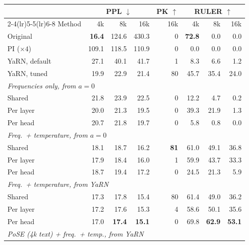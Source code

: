 
\begin{table}[t]
\centering
\footnotesize
\setlength{\tabcolsep}{2.4pt}
\begin{tabular}{@{}l rrr r rrr@{}}
\toprule
& \multicolumn{3}{c}{PPL $\downarrow$} & PK $\uparrow$ & \multicolumn{3}{c}{RULER $\uparrow$} \\
\cmidrule(lr){2-4}\cmidrule(lr){5-5}\cmidrule(lr){6-8}
Method & 4k & 8k & 16k & 16k & 4k & 8k & 16k \\
\midrule
Original     & \textbf{16.4} & 124.6 & 430.3 & 0 & \textbf{72.8} & 0.0 & 0.0 \\
PI ($\times 4$)   & 109.1 & 118.5 & 110.9 & 0 & 0.0 & 0.0 & 0.0 \\
YaRN, default     & 27.1 & 40.1 & 41.7 & 1 & 8.3 & 6.6 & 1.2 \\
YaRN, tuned       & 19.9 & 22.9 & 21.4 & 80 & 45.7 & 35.4 & 24.0 \\
\midrule
\multicolumn{8}{l}{\textit{Frequencies only, from $a{=}0$}} \\
\quad Shared      & 21.8 & 23.9 & 22.5 & 0 & 12.2 & 4.7 & 0.2 \\
\quad Per layer   & 20.0 & 21.3 & 19.5 & 0 & 39.3 & 21.9 & 1.3 \\
\quad Per head    & 20.7 & 21.8 & 19.7 & 0 & 5.8 & 0.8 & 0.0 \\
\multicolumn{8}{l}{\textit{Freq.\ + temperature, from $a{=}0$}} \\
\quad Shared      & 18.1 & 18.7 & 16.2 & \textbf{81} & 61.0 & 49.1 & 36.8 \\
\quad Per layer   & 17.9 & 18.4 & 16.0 & 1 & 59.9 & 43.7 & 33.3 \\
\quad Per head    & 18.7 & 19.4 & 17.2 & 0 & 24.5 & 21.3 & 5.9 \\
\multicolumn{8}{l}{\textit{Freq.\ + temperature, from YaRN}} \\
\quad Shared      & 17.3 & 17.8 & 15.4 & 80 & 61.4 & 49.0 & 36.2 \\
\quad Per layer   & 17.2 & 17.6 & 15.3 & 4 & 58.6 & 50.1 & 35.6 \\
\quad Per head    & 17.0 & \textbf{17.4} & \textbf{15.1} & 0 & 69.8 & \textbf{62.9} & \textbf{53.1} \\
\multicolumn{8}{l}{\textit{PoSE (4k text) + freq.\ + temp., from YaRN}} \\

\end{tabular}
\end{table}
